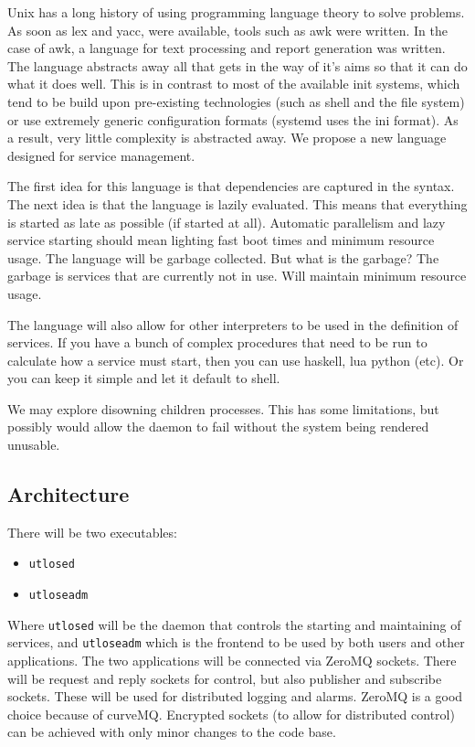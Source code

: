 \documentclass{article}
\begin{document}
Unix has a long history of using programming language theory to solve problems. As soon as
lex and yacc, were available, tools such as awk were written. In the case of awk, a language
for text processing and report generation was written. The language abstracts away all that
gets in the way of it's aims so that it can do what it does well. This is in contrast to most
of the available init systems, which tend to be build upon pre-existing technologies (such
as shell and the file system) or use extremely generic configuration formats (systemd uses
the ini format). As a result, very little complexity is abstracted away. We propose a
new language designed for service management.

The first idea for this language is that dependencies are captured in the syntax. The next idea
is that the language is lazily evaluated. This means that everything is started as late as possible
(if started at all). Automatic parallelism and lazy service starting should mean lighting fast
boot times and minimum resource usage. The language will be garbage collected. But what is
the garbage? The garbage is services that are currently not in use. Will maintain minimum
resource usage.

The language will also allow for other interpreters to be used in the definition of
services. If you have a bunch of complex procedures that need to be run to calculate how a service
must start, then you can use haskell, lua python (etc). Or you can keep it simple and let it
default to shell.

We may explore disowning children processes. This has some limitations, but possibly would allow
the daemon to fail without the system being rendered unusable.

\subsection{Architecture}
There will be two executables:
\begin{itemize}
  \item \texttt{utlosed}
  \item \texttt{utloseadm}
\end{itemize}
Where \texttt{utlosed} will be the daemon that controls the starting and maintaining of services, and
\texttt{utloseadm} which is the frontend to be used by both users and other applications.
The two applications will be connected via ZeroMQ sockets. There will be request and reply sockets
for control, but also publisher and subscribe sockets. These will be used for distributed logging and alarms.
ZeroMQ is a good choice because of curveMQ. Encrypted sockets (to allow for distributed control)
can be achieved with only minor changes to the code base.
\end{document}
